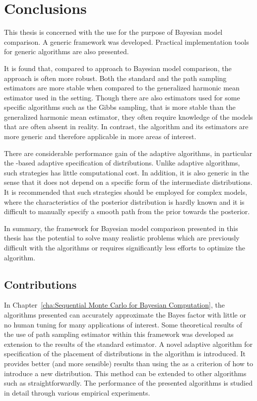 \chapter{Conclusions}
\label{cha:Conclusions}

This thesis is concerned with the use \smc for the purpose of Bayesian model
comparison. A generic framework was developed. Practical implementation tools
for generic \smc algorithms are also presented.

It is found that, compared to \mcmc approach to Bayesian model comparison, the
\smc approach is often more robust. Both the standard and the path sampling
estimators are more stable when compared to the generalized harmonic mean
estimator used in the \mcmc setting. Though there are also estimators used for
some specific \mcmc algorithms such as the Gibbs sampling, that is more stable
than the generalized harmonic mean estimator, they often require knowledge of
the models that are often absent in reality. In contrast, the \smc algorithm
and its estimators are more generic and therefore applicable in more areas of
interest.

There are considerable performance gain of the adaptive \smc algorithms, in
particular the \cess-based adaptive specification of distributions. Unlike
adaptive \mcmc algorithms, such strategies has little computational cost. In
addition, it is also generic in the sense that it does not depend on a
specific form of the intermediate distributions. It is recommended that such
strategies should be employed for complex models, where the characteristics of
the posterior distribution is hardly known and it is difficult to manually
specify a smooth path from the prior towards the posterior.

In summary, the \smc framework for Bayesian model comparison presented in this
thesis has the potential to solve many realistic problems which are previously
difficult with the \mcmc algorithms or requires significantly less efforts to
optimize the algorithm.

\section{Contributions}
\label{sec:Contributions}

In Chapter~\ref{cha:Sequential Monte Carlo for Bayesian Computation}, the
algorithms presented can accurately approximate the Bayes factor with little
or no human tuning for many applications of interest. Some theoretical results
of the use of path sampling estimator within this framework was developed as
extension to the results of the standard estimator. A novel adaptive algorithm
for specification of the placement of distributions in the \smc[2] algorithm
is introduced. It provides better (and more sensible) results than using the
\ess as a criterion of how to introduce a new distribution. This method can be
extended to other algorithms such as \smc[3] straightforwardly. The
performance of the presented algorithms is studied in detail through various
empirical experiments.

